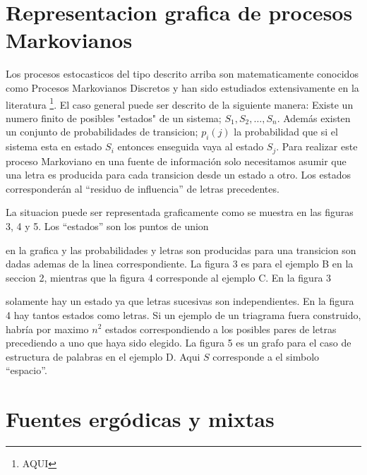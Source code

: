 \section{Representacion grafica de procesos Markovianos}

Los procesos estocasticos del tipo descrito arriba son matematicamente
conocidos como Procesos Markovianos Discretos y han sido estudiados
extensivamente en la literatura \footnote{AQUI}. El caso general puede
ser descrito de la siguiente manera: Existe un numero finito de
posibles "estados" de un sistema; $S_{1}, S_{2}, \ldots,
S_{n}$. Adem\'{a}s existen un conjunto de probabilidades de
transicion; $p_{i}(j)$ la probabilidad que si el sistema esta en
estado $S_{i}$ entonces enseguida vaya al estado $S_{j}$. Para
realizar este proceso Markoviano en una fuente de informaci\'{o}n solo
necesitamos asumir que una letra es producida para cada transicion
desde un estado a otro. Los estados corresponder\'{a}n al ``residuo de
influencia'' de letras precedentes.

La situacion puede ser representada graficamente como se muestra en
las figuras 3, 4 y 5. Los ``estados'' son los puntos de union


en la grafica y las probabilidades y letras son producidas para una
transicion son dadas ademas de la linea correspondiente. La figura 3
es para el ejemplo B en la seccion 2, mientras que la figura 4
corresponde al ejemplo C. En la figura 3


solamente hay un estado ya que letras sucesivas son independientes. En
la figura 4 hay tantos estados como letras. \newline Si un ejemplo de
un triagrama fuera construido, habr\'{i}a por maximo $n^{2}$ estados
correspondiendo a los posibles pares de letras precediendo a uno que
haya sido elegido. La figura 5 es un grafo para el caso de estructura
de palabras en el ejemplo D. Aqui $S$ corresponde a el simbolo
``espacio''. \newline

\section{Fuentes erg\'{o}dicas y mixtas}

